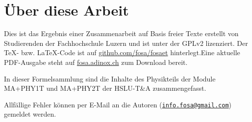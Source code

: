 



\chapter*{Über diese Arbeit}
Dies ist das Ergebnis einer Zusammenarbeit auf Basis freier Texte erstellt von 
Studierenden der Fachhochschule Luzern und ist unter der GPLv2 lizenziert. Der 
\TeX - bzw. \LaTeX -Code ist auf \url{github.com/fosa/fosaet} hinterlegt.Eine 
aktuelle PDF-Ausgabe steht auf \url{fosa.adinox.ch} zum Download bereit.

In dieser Formelsammlung sind die Inhalte des Physikteils der Module MA+PHY1T 
und MA+PHY2T der HSLU-T\&A zusammengefasst. 

Allfällige Fehler können per E-Mail an die Autoren 
(\href{mailto:info.fosa@gmail.com}{\nolinkurl{info.fosa@gmail.com}}) 
gemeldet werden. 
